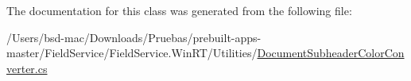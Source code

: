 The documentation for this class was generated from the following file\+:\begin{DoxyCompactItemize}
\item 
/\+Users/bsd-\/mac/\+Downloads/\+Pruebas/prebuilt-\/apps-\/master/\+Field\+Service/\+Field\+Service.\+Win\+R\+T/\+Utilities/\hyperlink{_document_subheader_color_converter_8cs}{Document\+Subheader\+Color\+Converter.\+cs}\end{DoxyCompactItemize}
